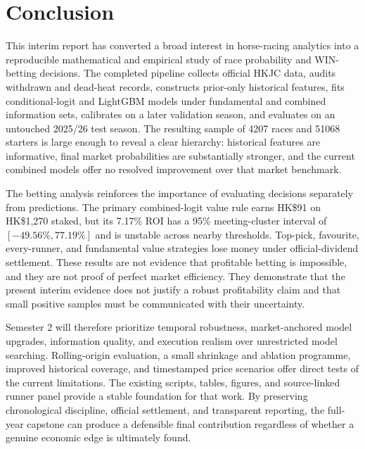 \section{Conclusion}\label{sec:conclusion}
This interim report has converted a broad interest in horse-racing analytics into a reproducible mathematical and empirical study of race probability and WIN-betting decisions. The completed pipeline collects official HKJC data, audits withdrawn and dead-heat records, constructs prior-only historical features, fits conditional-logit and LightGBM models under fundamental and combined information sets, calibrates on a later validation season, and evaluates on an untouched 2025/26 test season. The resulting sample of \num{4207} races and \num{51068} starters is large enough to reveal a clear hierarchy: historical features are informative, final market probabilities are substantially stronger, and the current combined models offer no resolved improvement over that market benchmark.

The betting analysis reinforces the importance of evaluating decisions separately from predictions. The primary combined-logit value rule earns HK\$91 on HK\$1,270 staked, but its 7.17\% ROI has a 95\% meeting-cluster interval of $[-49.56\%,77.19\%]$ and is unstable across nearby thresholds. Top-pick, favourite, every-runner, and fundamental value strategies lose money under official-dividend settlement. These results are not evidence that profitable betting is impossible, and they are not proof of perfect market efficiency. They demonstrate that the present interim evidence does not justify a robust profitability claim and that small positive samples must be communicated with their uncertainty.

Semester 2 will therefore prioritize temporal robustness, market-anchored model upgrades, information quality, and execution realism over unrestricted model searching. Rolling-origin evaluation, a small shrinkage and ablation programme, improved historical coverage, and timestamped price scenarios offer direct tests of the current limitations. The existing scripts, tables, figures, and source-linked runner panel provide a stable foundation for that work. By preserving chronological discipline, official settlement, and transparent reporting, the full-year capstone can produce a defensible final contribution regardless of whether a genuine economic edge is ultimately found.
